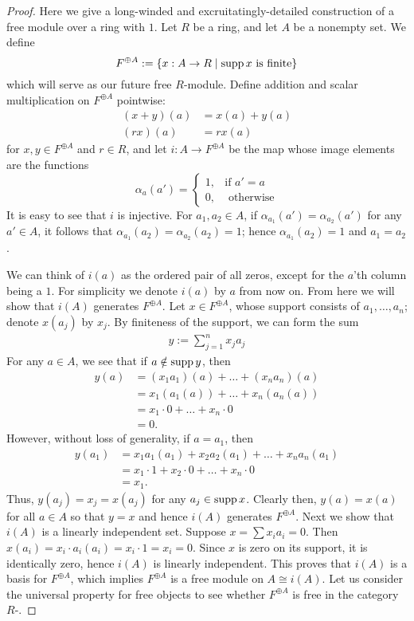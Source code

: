 \documentclass[12pt]{article}
\theoremstyle{definition}
\theoremstyle{plain}
\numberwithin{equation}{section}
\theoremstyle{definition}
\begin{document}
\begin{proof}
Here we give a long-winded and excruitatingly-detailed construction of a free module over a ring with $ 1 $.
Let $ R $ be a ring, and let $ A $ be a nonempty set. We define 
\[ F^{\oplus A} := \{ x: A \to R \mid \operatorname{supp}{x} \text{ is finite} \} \]
which will serve as our future free $ R $-module. Define addition and scalar multiplication on $ F^{\oplus A} $ pointwise:
\begin{align*}
	(x + y)(a) &= x(a) + y(a)\\
	(r x)(a)   &= r x(a)
\end{align*}
for $ x, y \in F^{\oplus A} $ and $ r \in R $, and let $ i : A \to F^{\oplus A} $ be the map whose image elements are the functions 
\[ \alpha_a(a') = \begin{cases}
		1, &\text{if } a'= a\\
		0, &\text{ otherwise}
\end{cases}\]
It is easy to see that $ i $ is injective. For $ a_1, a_2 \in A $, if $ \alpha_{a_1}(a') = \alpha_{a_2}(a') $ for any $ a' \in A $, it follows that $ \alpha_{a_1}(a_2) = \alpha_{a_2}(a_2) = 1 $; hence $ \alpha_{a_1}(a_2)  = 1 $ and $ a_1 = a_2 $.

We can think of $ i(a) $ as the ordered pair of all zeros, except for the $ a $'th column being a $ 1 $. For simplicity we denote $ i(a) $ by $ a $ from now on. From here we will show that $ i(A) $ generates $ F^{\oplus A} $. Let $ x \in F^{\oplus A} $, whose support consists of $ a_1, \ldots, a_n $; denote $ x(a_j) $ by $ x_j $. By finiteness of the support, we can form the sum
\begin{align*}
	y := \sum_{j = 1}^n x_j a_j
\end{align*}
For any $ a \in A $, we see that if $ a \notin \operatorname{supp}{y} $, then
\begin{align*}
	y(a) &= (x_1 a_1)(a) + \ldots + (x_n a_n)(a)\\
		 &= x_1 (a_1(a)) + \ldots + x_n (a_n(a))\\
		 &= x_1 \cdot 0 + \ldots + x_n \cdot 0\\
		 &= 0.
\end{align*} 
However, without loss of generality, if $ a = a_1 $, then
\begin{align*}
	y(a_1) &= x_1 a_1(a_1) + x_2 a_2(a_1) + \ldots + x_n a_n(a_1)\\
		   &= x_1 \cdot 1 + x_2 \cdot 0 + \ldots + x_n \cdot 0\\
		   &= x_1.
\end{align*}
Thus, $ y(a_j) = x_j = x(a_j) $ for any $ a_j \in \operatorname{supp}{x}$. Clearly then, $ y(a) = x(a)$ for all $ a \in A $ so that $ y = x $ and hence $ i(A) $ generates $ F^{\oplus A} $. Next we show that $ i(A) $ is a linearly independent set. Suppose $ x = \sum x_i a_i = 0 $. Then $ x(a_i) = x_i \cdot a_i(a_i) = x_i \cdot 1  = x_i = 0$. Since $ x $ is zero on its support, it is identically zero, hence $ i(A) $ is linearly independent. This proves that $ i(A) $ is a basis for $ F^{\oplus A} $, which implies $ F^{\oplus A} $ is a free module on $ A \cong i(A) $. Let us consider the universal property for free objects to see whether $ F^{\oplus A} $ is free in the category $ R $-.
\end{proof}
\end{document}
